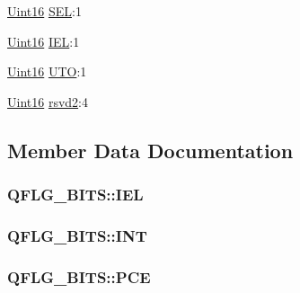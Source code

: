 \begin{DoxyCompactItemize}
\item 
\hyperlink{_d_s_p2833x___device_8h_a59a9f6be4562c327cbfb4f7e8e18f08b}{Uint16} \hyperlink{struct_q_f_l_g___b_i_t_s_aaf892d64e7f88bef637a8957c0420af3}{S\+E\+L}\+:1
\item 
\hyperlink{_d_s_p2833x___device_8h_a59a9f6be4562c327cbfb4f7e8e18f08b}{Uint16} \hyperlink{struct_q_f_l_g___b_i_t_s_ab2ef832b5f997c5e571a6fc501551d8c}{I\+E\+L}\+:1
\item 
\hyperlink{_d_s_p2833x___device_8h_a59a9f6be4562c327cbfb4f7e8e18f08b}{Uint16} \hyperlink{struct_q_f_l_g___b_i_t_s_a3e9f20ef95fa40f16985a509802e1e3e}{U\+T\+O}\+:1
\item 
\hyperlink{_d_s_p2833x___device_8h_a59a9f6be4562c327cbfb4f7e8e18f08b}{Uint16} \hyperlink{struct_q_f_l_g___b_i_t_s_a1e1f172ba3fa329a8095c4fd209cf5f4}{rsvd2}\+:4
\end{DoxyCompactItemize}


\subsection{Member Data Documentation}
\hypertarget{struct_q_f_l_g___b_i_t_s_ab2ef832b5f997c5e571a6fc501551d8c}{}
\subsubsection[{I\+E\+L}]{ Q\+F\+L\+G\+\_\+\+B\+I\+T\+S\+::\+I\+E\+L}\label{struct_q_f_l_g___b_i_t_s_ab2ef832b5f997c5e571a6fc501551d8c}
\hypertarget{struct_q_f_l_g___b_i_t_s_ad44b23620986326fa931182e223ce3ee}{}
\subsubsection[{I\+N\+T}]{ Q\+F\+L\+G\+\_\+\+B\+I\+T\+S\+::\+I\+N\+T}\label{struct_q_f_l_g___b_i_t_s_ad44b23620986326fa931182e223ce3ee}
\hypertarget{struct_q_f_l_g___b_i_t_s_abbeb34f3b3be33cafc6d3c8a715bb554}{}
\subsubsection[{P\+C\+E}]{ Q\+F\+L\+G\+\_\+\+B\+I\+T\+S\+::\+P\+C\+E}\label{struct_q_f_l_g___b_i_t_s_abbeb34f3b3be33cafc6d3c8a715bb554}
\hypertarget{struct_q_f_l_g___b_i_t_s_ad8ccd7585da9f6f0438a35baba79603c}{}
